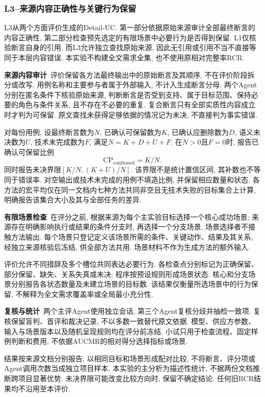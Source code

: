 \subsubsection{L3--来源内容正确性与关键行为保留}
\label{sec:exp-l3-v2}
L3从两个方面评价生成的Detail-UC. 第一部分依据原始来源审计全部最终断言的内容正确性, 第二部分检查预先选定的有限场景中必要行为是否得到保留. L1仅核验断言自身的引用, 而L3允许独立查找原始来源, 因此无引用或引用不当不直接等同于本层内容错误. 本实验不构建全文需求全集, 也不使用原相对完整率RCR.

\noindent\textbf{来源内容审计}\
评价保留各方法最终输出中的原始断言及其顺序, 不在评价阶段拆分或改写. 用例名称和主要参与者属于外部输入, 不计入生成断言分母. 两个Agent分别在匿名条件下核验原始来源, 判断断言是否受到支持、属于目标范围、保持必要的角色与条件关系, 且不存在不必要的重复. 复合断言只有全部实质性内容成立时才判为可保留. 原文查找未获得足够依据的情况记为未决, 不直接判为事实错误.

对每份用例, 设最终断言数为$N$, 已确认可保留数为$K$, 已确认应删除数为$D$, 语义未决数为$U$, 技术未完成数为$F$, 满足$N=K+D+U+F$. 在$N>0$且$F=0$时, 报告已确认可保留比例
\begin{equation}
\mathrm{CP}_{\mathrm{confirmed}}=K/N.
\end{equation}
同时报告未决界限$[K/N,(K+U)/N]$. 该界限不是统计置信区间, 其补数也不等同于错误率. 对空输出或技术未完成的用例不填造比例, 并保留相应数量和状态. 各方法的宏平均仅在同一文档内七种方法共同非空且无技术失败的目标集合上计算, 明确报告该集合大小及其与全部任务的差异.

\noindent\textbf{有限场景检查}\
在评分之前, 根据来源为每个主实验目标选择一个核心成功场景; 来源存在明确影响执行或结果的条件分支时, 再选择一个分支场景. 场景选择者不接触方法输出. 每个场景只登记定义该场景所需的条件、关键动作、结果及其关系, 经独立来源核验后冻结, 供全部方法共用. 场景材料不作为生成方法的额外输入.

评价允许不同措辞及多个槽位共同表达必要行为. 各检查点分别标记为正确保留、部分保留、缺失、关系失真或未决; 程序按预设规则形成场景状态. 核心和分支场景分别报告各状态数量及未建立场景的目标数. 该结果仅衡量所选场景中的行为保留, 不解释为全文需求覆盖率或全局最小充分性.

\noindent\textbf{复核与统计}\
两个主评Agent使用独立会话, 第三个Agent复核分歧并抽检一致项. 复核保留盲判、首评和裁决记录, 不以多数一致替代原文依据. 模型、供应方参数、输入与场景版本以及随机呈现规则均在评分前冻结. 小试只用于检查流程、固定样例判断和费用, 不依据AUCMR的相对得分选择指标或场景.

结果按来源文档分别报告, 以相同目标和场景形成配对比较, 不将断言、评分项或Agent调用次数当成独立项目样本. 本实验的主分析为描述性统计, 不据两份文档推断跨项目显著优势. 未决界限可能改变比较方向时, 保留不确定结论. 任何旧RCR结果均不沿用至本评价.

% 
% 
% 
